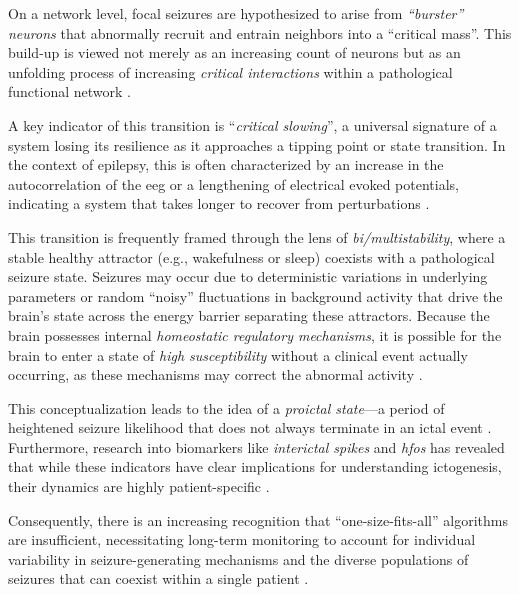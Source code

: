 On a network level, focal seizures are hypothesized to arise from \textit{\enquote{burster} neurons} that abnormally recruit and entrain neighbors into a \enquote{critical mass}.
This build-up is viewed not merely as an increasing count of neurons but as an unfolding process of increasing \textit{critical interactions} within a pathological functional network \parencite{mormann_seizure_2007}.

A key indicator of this transition is \enquote{\textit{critical slowing}}, a universal signature of a system losing its resilience as it approaches a tipping point or state transition.
In the context of epilepsy, this is often characterized by an increase in the autocorrelation of the \gls{eeg} or a lengthening of electrical evoked potentials, indicating a system that takes longer to recover from perturbations  \parencite{freestone_forward-looking_2017, maturana_critical_2020}.

This transition is frequently framed through the lens of \textit{bi/multistability}, where a stable healthy attractor (e.g., wakefulness or sleep) coexists with a pathological seizure state.
Seizures may occur due to deterministic variations in underlying parameters or random \enquote{noisy} fluctuations in background activity that drive the brain's state across the energy barrier separating these attractors.
Because the brain possesses internal \textit{homeostatic regulatory mechanisms}, it is possible for the brain to enter a state of \textit{high susceptibility} without a clinical event actually occurring, as these mechanisms may correct the abnormal activity \parencite{freestone_forward-looking_2017}.

This conceptualization leads to the idea of a \textit{proictal state}---a period of heightened seizure likelihood that does not always terminate in an ictal event \parencite{muller_coherent_2022}.
Furthermore, research into biomarkers like \textit{interictal spikes} and \textit{\glspl{hfo}} has revealed that while these indicators have clear implications for understanding ictogenesis, their dynamics are highly patient-specific \parencite{freestone_forward-looking_2017}.

Consequently, there is an increasing recognition that \enquote{one-size-fits-all} algorithms are insufficient, necessitating long-term monitoring to account for individual variability in seizure-generating mechanisms and the diverse populations of seizures that can coexist within a single patient \parencite{freestone_forward-looking_2017, yang_seizure_2024}.



